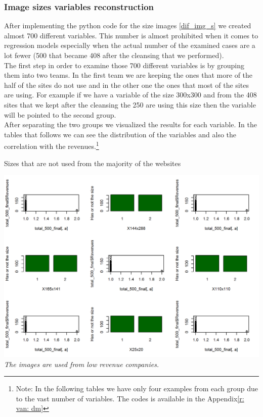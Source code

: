 \documentclass{book}
\begin{document}
\subsubsection{Image sizes variables reconstruction}
After implementing the python code for the size images \ref{dif_img_s} we created almost 700 different variables. This number is almost prohibited when it comes to regression models especially when the actual number of the examined cases are a lot fewer (500 that became 408 after the cleansing that we performed).\\
The first step in order to examine those 700 different variables is by grouping them into two teams. In the first team we are keeping the ones that more of the half of the sites do not use and in the other one the ones that most of the sites are using. For example if we have a variable of the size 300x300 and from the 408 sites that we kept after the cleansing the 250 are using this size then the variable will be pointed to the second group.\\
After separating the two groups we visualized the results for each variable. In the tables that follows we can see the distribution of the variables and also the correlation with the revenues.\footnote{Note: In the following tables we have only four examples from each group due to the vast number of variables. The codes is available in the Appendix\ref{r: van: dm}}
\begin{table}[H]
\centering
\caption{Sizes that are not used from the majority of the websites}
\begin{center}
\includegraphics[scale=0.5]{../R/photos/64_size_no.png}    \\
\textit{The images are used from low revenue companies.}
\end{center}
\end{table}
\end{document}
